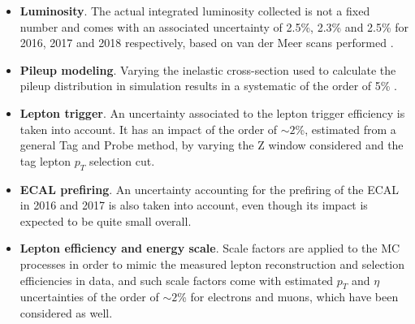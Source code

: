 \documentclass[a4paper, 10pt, openright]{report}
\begin{document}
\begin{itemize}
\item \textbf{Luminosity}. The actual integrated luminosity collected is not a fixed number and comes with an associated uncertainty of 2.5\%, 2.3\% and 2.5\% for 2016, 2017 and 2018 respectively, based on van der Meer scans performed \cite{Lumi2016, Lumi2017, Lumi2018}.
\item \textbf{Pileup modeling}. Varying the inelastic cross-section used to calculate the pileup distribution in simulation results in a systematic of the order of 5\% \cite{PUmodel}.
\item \textbf{Lepton trigger}. An uncertainty associated to the lepton trigger efficiency is taken into account. It has an impact of the order of $\sim 2$\%, estimated from a general Tag and Probe method, by varying the Z window considered and the tag lepton $p_T$ selection cut. 
\item \textbf{\ac{ECAL} prefiring}. An uncertainty accounting for the prefiring of the \ac{ECAL} in 2016 and 2017 is also taken into account, even though its impact is expected to be quite small overall.
\item \textbf{Lepton efficiency and energy scale}. Scale factors are applied to the \ac{MC} processes in order to mimic the measured lepton reconstruction and selection efficiencies in data, and such scale factors come with estimated $p_T$ and $\eta$ uncertainties of the order of $\sim2$\% for electrons and muons, which have been considered as well.  

\end{itemize}
\end{document}
